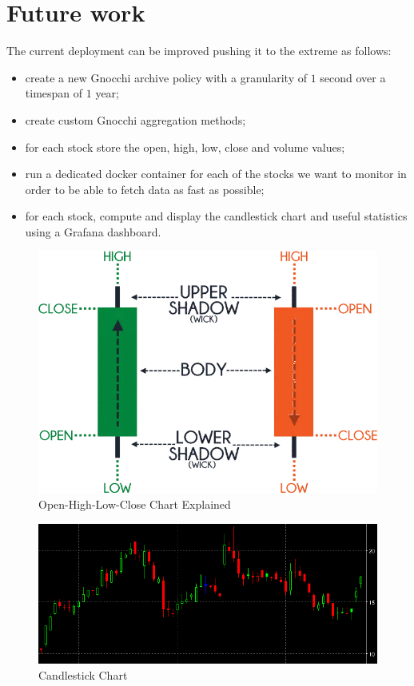 \documentclass[11pt,a4paper]{article}
\begin{document}
\section{Future work}
The current deployment can be improved pushing it to the extreme as follows:
\begin{itemize}
    \item create a new Gnocchi archive policy with a granularity of $1$ second over a timespan of $1$ year;
    \item create custom Gnocchi aggregation methods;
    \item for each stock store the open, high, low, close and volume values;
    \item run a dedicated docker container for each of the stocks we want to monitor in order to be able to fetch data as fast as possible;
    \item for each stock, compute and display the candlestick chart and useful statistics using a Grafana dashboard.
\end{itemize}
\begin{figure}[H]
    \centering
    \includegraphics[scale=0.41]{imgs/ohlc-explained.png}
    \caption{Open-High-Low-Close Chart Explained}
\end{figure}
\begin{figure}[H]
    \centering
    \includegraphics[scale=0.585]{imgs/candlestickchart.png}
    \caption{Candlestick Chart}
\end{figure}
\end{document}

